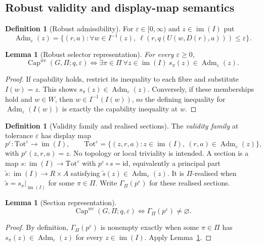 \documentclass[11pt]{article}
\theoremstyle{plain}
\newtheorem{lemma}[theorem]{Lemma}
\theoremstyle{definition}
\newtheorem{definition}[theorem]{Definition}
\theoremstyle{remark}
\newcommand{\im}{\operatorname{im}}
\newcommand{\Capability}{\operatorname{Cap}}
\newcommand{\Adm}{\operatorname{Adm}}
\newcommand{\eps}{\varepsilon}
\begin{document}
\subsection{Robust validity and display-map semantics}

\begin{definition}[Robust admissibility]\label{def:eps}
For $\eps\in[0,\infty)$ and $z\in\im(I)$ put
\[
\Adm_\eps(z)=\{(r,a):\forall w\in I^{-1}(z),
\ \ell(r,q(U(w,D(r),a)))\le\eps\}.
\]
\end{definition}

\begin{lemma}[Robust selector representation]\label{lem:robust-selector}
For every $\eps\ge0$,
\[
\Capability^{wc}(G,\Pi;q,\eps)
\iff
\exists\pi\in\Pi\ \forall z\in\im(I)\ s_\pi(z)\in\Adm_\eps(z).
\]
\end{lemma}

\begin{proof}
If capability holds, restrict its inequality to each fibre and substitute
$I(w)=z$. This shows $s_\pi(z)\in\Adm_\eps(z)$. Conversely, if these memberships
hold and $w\in W$, then $w\in I^{-1}(I(w))$, so the defining inequality for
$\Adm_\eps(I(w))$ is exactly the capability inequality at $w$.
\end{proof}

\begin{definition}[Validity family and realised sections]\label{def:bundle}
The \emph{validity family} at tolerance $\eps$ has display map
\[
p^\eps:\mathrm{Tot}^\eps\to\im(I),\qquad
\mathrm{Tot}^\eps=
\{(z,r,a):z\in\im(I),\ (r,a)\in\Adm_\eps(z)\},
\]
with $p^\eps(z,r,a)=z$. No topology or local triviality is intended. A section
is a map $s:\im(I)\to\mathrm{Tot}^\eps$ with
$p^\eps\circ s=\mathrm{id}$, equivalently a principal part
$\widetilde s:\im(I)\to R\times A$ satisfying
$\widetilde s(z)\in\Adm_\eps(z)$. It is $\Pi$-realised when
$\widetilde s=s_\pi|_{\im(I)}$ for some $\pi\in\Pi$. Write
$\Gamma_\Pi(p^\eps)$ for these realised sections.
\end{definition}

\begin{lemma}[Section representation]\label{lem:section-representation}
\[
\Capability^{wc}(G,\Pi;q,\eps)
\iff
\Gamma_\Pi(p^\eps)\ne\varnothing.
\]
\end{lemma}

\begin{proof}
By definition, $\Gamma_\Pi(p^\eps)$ is nonempty exactly when some
$\pi\in\Pi$ has $s_\pi(z)\in\Adm_\eps(z)$ for every $z\in\im(I)$. Apply
Lemma~\ref{lem:robust-selector}.
\end{proof}
\end{document}
